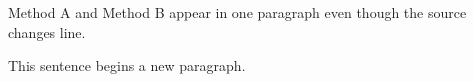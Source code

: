 \documentclass{article} %
\begin{document}
Method A and     Method B
appear in one paragraph even though
the source changes line.

This sentence begins a new paragraph.
\end{document}
